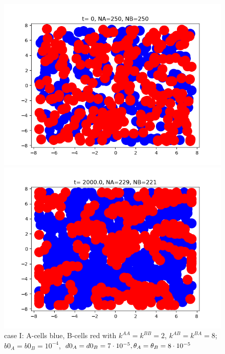 \begin{figure}[htb]
	\begin{minipage}[t]{.45\textwidth}
		\centering
		\includegraphics[width=\textwidth]{micro_caseI_ini3}
	\end{minipage}
	\hfill
	\begin{minipage}[t]{.45\textwidth}
		\centering
		\includegraphics[width=\textwidth]{micro_caseI_fin3}
	\end{minipage}  
	\label{fig:1-2}
	\caption{{case I: A-cells blue, B-cells red with $k^{AA}=k^{BB}=2 $, $k^{AB}=k^{BA}=8$; $b0_A=b0_B=10^{-4}$, $d0_A=d0_B=7\cdot10^{-5}, {\theta}_A={\theta}_B=8\cdot 10^{-5}$}	}
\end{figure}



